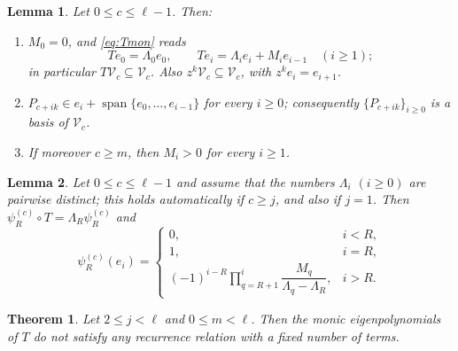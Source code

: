 \documentclass[10pt,a4paper]{amsart}
\newtheorem{lemma}{Lemma}
\newtheorem{theorem}{Theorem}
\DeclareMathOperator{\spn}{span}
\begin{document}
\begin{lemma}\label{lem:basis}
Let \(0\le c\le\ell-1\).  Then:
\begin{enumerate}
\item \(M_0=0\), and \eqref{eq:Tmon} reads
\begin{equation}\label{eq:bidiagonal}
Te_0=\Lambda_0e_0,
\qquad
Te_i=\Lambda_ie_i+M_ie_{i-1}\quad(i\ge1);
\end{equation}
in particular \(T\mathcal V_c\subseteq\mathcal V_c\).  Also
\(z^k\mathcal V_c\subseteq\mathcal V_c\), with \(z^k e_i=e_{i+1}\).
\item \(P_{c+ik}\in e_i+\spn\{e_0,\dots,e_{i-1}\}\) for every \(i\ge0\);
consequently \(\{P_{c+ik}\}_{i\ge0}\) is a basis of \(\mathcal V_c\).
\item If moreover \(c\ge m\), then \(M_i>0\) for every \(i\ge1\).
\end{enumerate}
\end{lemma}

\begin{lemma}\label{lem:coordinate}
Let \(0\le c\le\ell-1\) and assume that the numbers \(\Lambda_i\)
\((i\ge0)\) are pairwise distinct; this holds automatically if \(c\ge j\),
and also if \(j=1\).  Then \(\psi^{(c)}_R\circ T=\Lambda_R\psi^{(c)}_R\) and
\begin{equation}\label{eq:coordinate}
\psi^{(c)}_R(e_i)=
\begin{cases}
0,&i<R,\\[2pt]
1,&i=R,\\[2pt]
\displaystyle(-1)^{i-R}\prod_{q=R+1}^{i}
\dfrac{M_q}{\Lambda_q-\Lambda_R},&i>R.
\end{cases}
\end{equation}
\end{lemma}

\begin{theorem}\label{thm:jge2}
Let \(2\le j<\ell\) and \(0\le m<\ell\).  Then the monic eigenpolynomials of
\(T\) do not satisfy any recurrence relation with a fixed number of terms.
\end{theorem}
\end{document}
